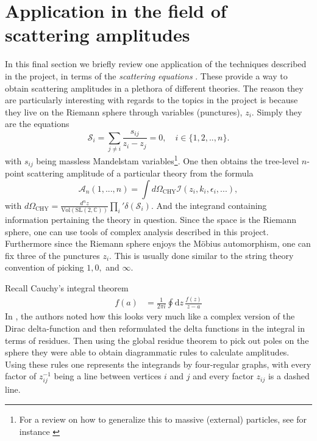 \documentclass[lettersize,12pt]{article}
\begin{document}
\section{Application in the field of scattering amplitudes}
In this final section we briefly review one application of the techniques described in the project, in terms of the \textit{scattering equations} \cite{Cachazo:2013iea}. These provide a way to obtain scattering amplitudes in a plethora of different theories. The reason they are particularly interesting with regards to the topics in the project is because they live on the Riemann sphere through variables (punctures), $z_i$. Simply they are the equations
\begin{equation}
	\mathcal{S}_i=\sum_{j\neq i}\frac{s_{ij}}{z_i-z_j}=0,\quad i\in\{1,2,..,n\}.	\label{ScatteringEquations}
\end{equation}
with $s_{ij}$ being massless Mandelstam variables\footnote{For a review on how to generalize this to massive (external) particles, see for instance \cite{Bjerrum-Bohr:2019nws}}.
One then obtains the tree-level $n$-point scattering amplitude of a particular theory from the formula
\begin{equation}
	\mathcal{A}_n(1,...,n)=\int d\Omega_{\text{CHY}} \mathcal{I}(z_i,k_i,\epsilon_i,...), \label{CHYformula1}
\end{equation}
with $ d\Omega_{\text{CHY}}=\frac{d^nz}{\text{Vol}(\text{SL}(2,\mathbb{C}))}\prod_{i}'\delta(\mathcal{S}_i) $. And the integrand containing information pertaining the theory in question.
Since the space is the Riemann sphere, one can use tools of complex analysis described in this project. Furthermore since the Riemann sphere enjoys the Möbius automorphism, one can fix three of the punctures $z_i$. This is usually done similar to the string theory convention of picking $1,0,$ and $\infty$.

Recall Cauchy's integral theorem
\begin{equation}
	\begin{aligned}
		f(a)&=\frac{1}{2\pi i}\oint \text{d}z\,\frac{f(z)}{z-a}
	\end{aligned}
\end{equation}
In \cite{Baadsgaard:2015voa}, the authors noted how this looks very much like a complex version of the Dirac delta-function and then reformulated the delta functions in the integral in terms of residues. Then using the global residue theorem to pick out poles on the sphere they were able to obtain diagrammatic rules to calculate amplitudes. Using these rules one represents the integrands by four-regular graphs, with every factor of $ z_{ij}^{-1} $ being a line between vertices $ i $ and $ j $ and every factor $ z_{ij} $ is a dashed line. 
\end{document}
